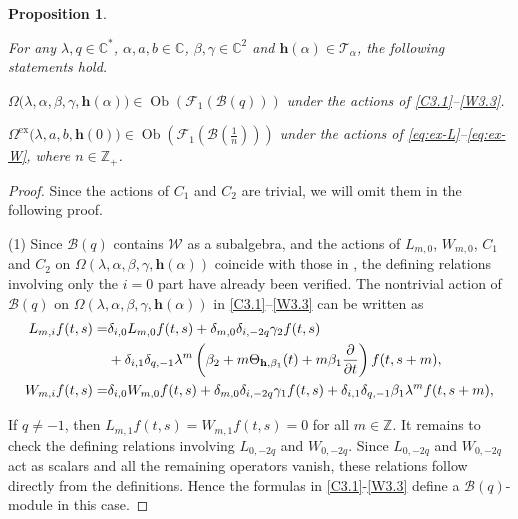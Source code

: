 \documentclass[a4paper]{amsart}
\numberwithin{equation}{section}
\newtheorem{proposition}[theorem]{Proposition}
\begin{document}
\begin{proposition}\label{prop3.1}

For any $\lambda,q\in\mathbb{C}^*$, $\alpha,a,b\in\mathbb C$, $\beta,\gamma\in \mathbb{C}^2$ and $\mathbf{h}(\alpha)\in\mathcal{T}_{\alpha}$, the following statements hold. 
\item[{\rm (1)}]
$\Omega\big(\lambda,\alpha,\beta,\gamma,\mathbf h(\alpha)\big)\in \operatorname{Ob}(\mathcal F_1(\mathcal B(q)))$ under the actions of 
\eqref{C3.1}--\eqref{W3.3}.
\item[{\rm (2)}] $\Omega^{\mathrm{ex}}\big(\lambda,a,b,\mathbf h(0)\big)\in\operatorname{Ob}(\mathcal F_1(\mathcal B(\frac{1}{n})))$ under the actions of \eqref{eq:ex-L}--\eqref{eq:ex-W}, where $n\in\mathbb Z_+$.
\end{proposition}
\begin{proof}
Since the actions of 
$C_1$
  and 
$C_2$ are trivial, we will omit them in the following proof.

{\rm (1)}
Since $\mathcal{B}(q)$ contains   $\mathcal{W}$ as a subalgebra, and the actions of $L_{m,0}$, $W_{m,0}$, $C_1$ and $C_2$ on $\Omega(\lambda,\alpha,\beta,\gamma,\mathbf h(\alpha))$ coincide with those in \cite{CG17}, the defining relations involving only the  $i=0$ part have already been verified. 
The  nontrivial  action of $\mathcal{B}(q)$ on $\Omega(\lambda,\alpha,\beta,\gamma,\mathbf h(\alpha))$ in \eqref{C3.1}--\eqref{W3.3} can be written as 
 \begin{align*}
      L_{m,i} f(t,s)=&
      \delta_{i,0}L_{m,0}f(t,s)
+\delta_{m,0}\delta_{i,-2q}\gamma_{2}f(t,s) \\
&+\delta_{i,1}\delta_{q,-1}\lambda^m
\left(\beta_2+m\Theta_{\mathbf h,\beta_1}(t)
+m\beta_1\frac{\partial}{\partial t}\right)f(t,s+m),
     \notag \\
      W_{m,i} f(t,s)=&
      \delta_{i,0}W_{m,0}f(t,s)
+\delta_{m,0}\delta_{i,-2q}\gamma_{1}f(t,s) +\delta_{i,1}\delta_{q,-1}\beta_{1}\lambda^{m}f(t,s+m),
     \end{align*}



If $q\neq -1$, then $L_{m,1}f(t,s)=W_{m,1}f(t,s)=0$ for all $m\in\mathbb Z$. It remains to check the defining relations involving $L_{0,-2q}$ and $W_{0,-2q}$. Since $L_{0,-2q}$ and $W_{0,-2q}$ act as scalars and all the remaining operators vanish, these relations follow directly from the definitions. Hence the formulas in \eqref{C3.1}-\eqref{W3.3} define a $\mathcal{B}(q)$-module in this case.


\end{proof}
\end{document}
